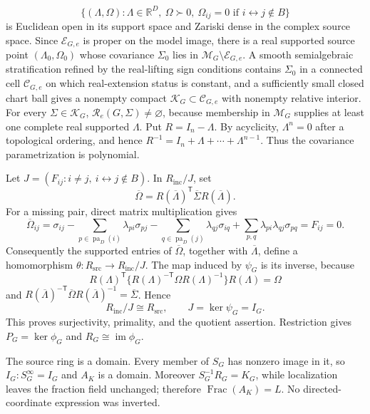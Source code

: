 \[
\{(\Lambda,\Omega):\Lambda\in\mathbb R^D,\ \Omega\succ0,\ \Omega_{ij}=0\text{ if }i\leftrightarrow j\notin B\}
\]
is Euclidean open in its support space and Zariski dense in the complex source space. Since \(\mathcal E_{G,e}\) is proper on the model image, there is a real supported source point \((\Lambda_0,\Omega_0)\) whose covariance \(\Sigma_0\) lies in \(\mathcal M_G\setminus\mathcal E_{G,e}\). A smooth semialgebraic stratification refined by the real-lifting sign conditions contains \(\Sigma_0\) in a connected cell \(\mathcal C_{G,e}\) on which real-extension status is constant, and a sufficiently small closed chart ball gives a nonempty compact \(\mathcal K_G\subset\mathcal C_{G,e}\) with nonempty relative interior. For every \(\Sigma\in\mathcal K_G\), \(\mathcal R_e(G,\Sigma)\ne\varnothing\), because membership in \(\mathcal M_G\) supplies at least one complete real supported \(\Lambda\).
Put \(R=I_n-\Lambda\). By acyclicity, \(\Lambda^n=0\) after a topological ordering, and hence \(R^{-1}=I_n+\Lambda+\cdots+\Lambda^{n-1}\). Thus the covariance parametrization is polynomial.

Let \(J=(F_{ij}:i\ne j,\ i\leftrightarrow j\notin B)\). In \(R_{\mathrm{inc}}/J\), set
\[
\overline\Omega=R(\overline\Lambda)^{\mathsf T}\overline\Sigma R(\overline\Lambda).
\]
For a missing pair, direct matrix multiplication gives
\[
\overline\Omega_{ij}=\sigma_{ij}
-\sum_{p\in\operatorname{pa}_D(i)}\lambda_{pi}\sigma_{pj}
-\sum_{q\in\operatorname{pa}_D(j)}\lambda_{qj}\sigma_{iq}
+\sum_{p,q}\lambda_{pi}\lambda_{qj}\sigma_{pq}=F_{ij}=0.
\]
Consequently the supported entries of \(\overline\Omega\), together with \(\overline\Lambda\), define a homomorphism \(\theta:R_{\mathrm{src}}\to R_{\mathrm{inc}}/J\). The map induced by \(\psi_G\) is its inverse, because
\[
R(\Lambda)^{\mathsf T}\{R(\Lambda)^{-\mathsf T}\Omega R(\Lambda)^{-1}\}R(\Lambda)=\Omega
\]
and \(R(\overline\Lambda)^{-\mathsf T}\overline\Omega R(\overline\Lambda)^{-1}=\overline\Sigma\). Hence
\[
R_{\mathrm{inc}}/J\cong R_{\mathrm{src}},\qquad J=\ker\psi_G=I_G.
\]
This proves surjectivity, primality, and the quotient assertion. Restriction gives \(P_G=\ker\phi_G\) and \(R_G\cong\operatorname{im}\phi_G\).

The source ring is a domain. Every member of \(S_G\) has nonzero image in it, so \(I_G:S_G^\infty=I_G\) and \(A_K\) is a domain. Moreover \(S_G^{-1}R_G=K_G\), while localization leaves the fraction field unchanged; therefore \(\operatorname{Frac}(A_K)=L\). No directed-coordinate expression was inverted.

